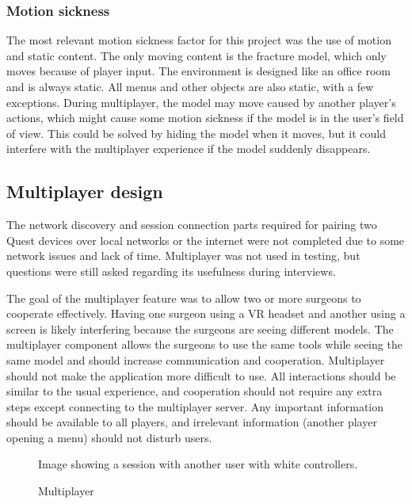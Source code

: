 \documentclass[a4paper]{report}
\begin{document}
\subsubsection{Motion sickness}
The most relevant motion sickness factor for this project was the use of motion and static content. The only moving content is the fracture model, which only moves because of player input. The environment is designed like an office room and is always static. All menus and other objects are also static, with a few exceptions.
During multiplayer, the model may move caused by another player's actions, which might cause some motion sickness if the model is in the user's field of view. This could be solved by hiding the model when it moves, but it could interfere with the multiplayer experience if the model suddenly disappears.

\subsection{Multiplayer design}
The network discovery and session connection parts required for pairing two Quest devices over local networks or the internet were not completed due to some network issues and lack of time. Multiplayer was not used in testing, but questions were still asked regarding its usefulness during interviews.

The goal of the multiplayer feature was to allow two or more surgeons to cooperate effectively. Having one surgeon using a VR headset and another using a screen is likely interfering because the surgeons are seeing different models. The multiplayer component allows the surgeons to use the same tools while seeing the same model and should increase communication and cooperation.
Multiplayer should not make the application more difficult to use. All interactions should be similar to the usual experience, and cooperation should not require any extra steps except connecting to the multiplayer server. Any important information should be available to all players, and irrelevant information (another player opening a menu) should not disturb users.

\begin{figure}[h!]
    \centering
	\hfill
	\caption{Multiplayer}\label{multiplayer}
  \small
  Image showing a session with another user with white controllers.
\end{figure}
\end{document}
